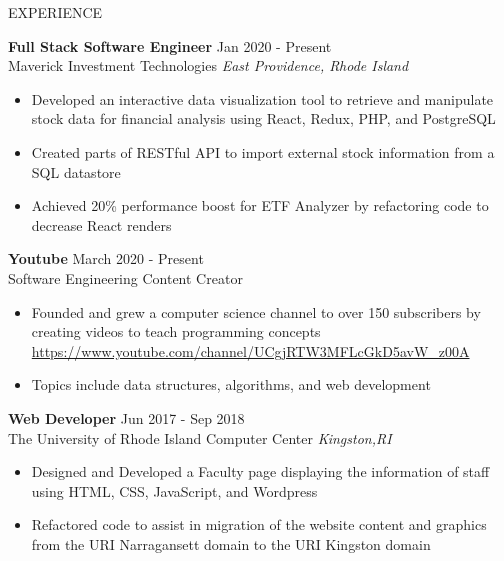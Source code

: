 \documentclass{resume} %
\begin{document}
\begin{rSection}{EXPERIENCE}

\textbf{Full Stack Software Engineer} \hfill Jan 2020 - Present\\
Maverick Investment Technologies \hfill \textit{East Providence, Rhode Island}
 \begin{itemize}
    \itemsep -3pt {} 
    \item Developed an interactive data visualization tool to retrieve and manipulate stock data for financial analysis using React, Redux, PHP, and PostgreSQL
    
    \item Created parts of RESTful API to import external stock information from a SQL datastore 
     \item Achieved 20\% performance boost for ETF Analyzer by refactoring code to decrease React renders
 \end{itemize}
 
\textbf{Youtube} \hfill  March 2020 - Present\\
Software Engineering Content Creator \hfill 
 \begin{itemize}
    \itemsep -3pt {} 
     \item Founded and grew a computer science channel to over 150 subscribers by creating videos to teach programming concepts 
     \href{https://www.youtube.com/channel/UCgjRTW3MFLcGkD5avW_z00A}{https://www.youtube.com/channel/UCgjRTW3MFLcGkD5avW_z00A}
     \item Topics include data structures, algorithms, and web development
     
   
 \end{itemize}
 
 \textbf{Web Developer} \hfill  Jun 2017 - Sep 2018\\
The University of Rhode Island Computer Center \hfill \textit{Kingston,RI}
 \begin{itemize}
    \itemsep -3pt {} 
     \item Designed and Developed a Faculty page displaying the information of staff using HTML, CSS, JavaScript, and Wordpress
     \item Refactored code to assist in migration of the website content and graphics from the URI Narragansett domain to the URI Kingston domain 

    
 \end{itemize}

\end{rSection} 
\end{document}
